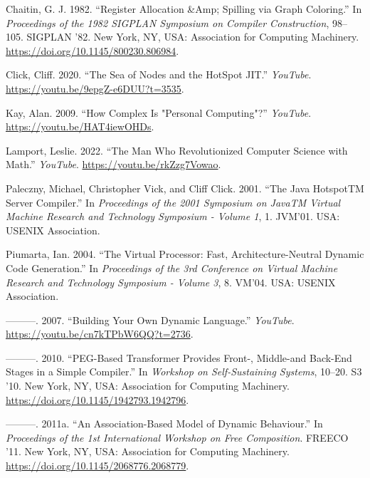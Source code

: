\hypertarget{refs}{}
\begin{CSLReferences}{1}{0}
\leavevmode{}%
Chaitin, G. J. 1982. {``Register Allocation \&Amp; Spilling via Graph
Coloring.''} In \emph{Proceedings of the 1982 SIGPLAN Symposium on
Compiler Construction}, 98--105. SIGPLAN '82. New York, NY, USA:
Association for Computing Machinery.
\url{https://doi.org/10.1145/800230.806984}.

\leavevmode{}%
Click, Cliff. 2020. {``The Sea of Nodes and the HotSpot JIT.''}
\emph{YouTube}. \url{https://youtu.be/9epgZ-e6DUU?t=3535}.

\leavevmode{}%
Kay, Alan. 2009. {``How Complex Is "Personal Computing"?''}
\emph{YouTube}. \url{https://youtu.be/HAT4iewOHDs}.

\leavevmode{}%
Lamport, Leslie. 2022. {``The Man Who Revolutionized Computer Science
with Math.''} \emph{YouTube}. \url{https://youtu.be/rkZzg7Vowao}.

\leavevmode{}%
Paleczny, Michael, Christopher Vick, and Cliff Click. 2001. {``The Java
HotspotTM Server Compiler.''} In \emph{Proceedings of the 2001 Symposium
on JavaTM Virtual Machine Research and Technology Symposium - Volume 1},
1. JVM'01. USA: USENIX Association.

\leavevmode{}%
Piumarta, Ian. 2004. {``The Virtual Processor: Fast,
Architecture-Neutral Dynamic Code Generation.''} In \emph{Proceedings of
the 3rd Conference on Virtual Machine Research and Technology Symposium
- Volume 3}, 8. VM'04. USA: USENIX Association.

\leavevmode{}%
---------. 2007. {``Building Your Own Dynamic Language.''}
\emph{YouTube}. \url{https://youtu.be/cn7kTPbW6QQ?t=2736}.

\leavevmode{}%
---------. 2010. {``PEG-Based Transformer Provides Front-, Middle-and
Back-End Stages in a Simple Compiler.''} In \emph{Workshop on
Self-Sustaining Systems}, 10--20. S3 '10. New York, NY, USA: Association
for Computing Machinery. \url{https://doi.org/10.1145/1942793.1942796}.

\leavevmode{}%
---------. 2011a. {``An Association-Based Model of Dynamic Behaviour.''}
In \emph{Proceedings of the 1st International Workshop on Free
Composition}. FREECO '11. New York, NY, USA: Association for Computing
Machinery. \url{https://doi.org/10.1145/2068776.2068779}.


\end{CSLReferences}
